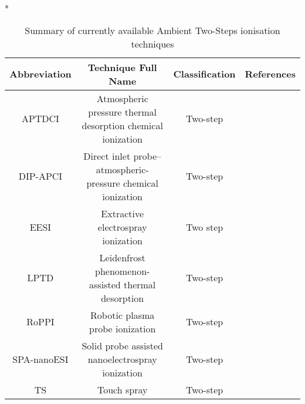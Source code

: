 \begin{table}{*}
\caption{Summary of currently available Ambient Two-Steps ionisation techniques}
\label{table:Ambient_TwoSteps}

\centering 
\scriptsize

    \begin{tabular}{|c|c|c|l|}
        \hline
        \textbf{Abbreviation}  & \textbf{Technique Full Name} & \textbf{Classification} & \textbf{References} \\ 
        \hline \hline 
        APTDCI & Atmospheric pressure thermal desorption chemical ionization & Two-step & \cite{21683155} \\
        DIP-APCI & Direct inlet probe–atmospheric-pressure chemical ionization & Two-step & \cite{23912829} \\
        EESI & Extractive electrospray ionization & Two step & \cite{16767269} \\
        LPTD & Leidenfrost phenomenon-assisted thermal desorption & Two-step & \cite{23423791} \\
        RoPPI & Robotic plasma probe ionization & Two-step & \cite{24603806} \\
        SPA-nanoESI & Solid probe assisted nanoelectrospray ionization & Two-step & \cite{22937532} \\
        TS & Touch spray & Two-step & \cite{24756256} \\
        \hline \hline 
    \end{tabular}
\end{table}
